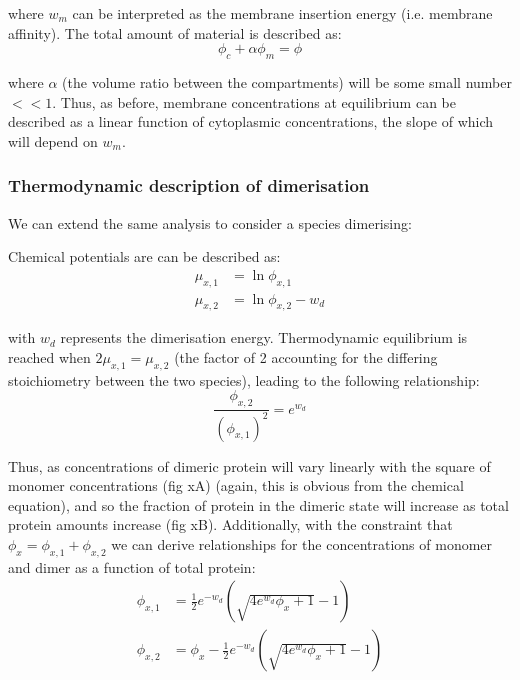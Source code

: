 \documentclass[12pt]{"article"}
\begin{document}
where $w_m$ can be interpreted as the membrane insertion energy (i.e. membrane affinity). The total amount of material is described as:
\begin{equation}
\phi_c + \alpha\phi_m = \phi
\end{equation}

where $\alpha$ (the volume ratio between the compartments) will be some small number $<<1$. Thus, as before, membrane concentrations at equilibrium can be described as a linear function of cytoplasmic concentrations, the slope of which will depend on $w_m$.\\

\subsubsection{Thermodynamic description of dimerisation}

We can extend the same analysis to consider a species dimerising:

\begin{center}
\end{center}

Chemical potentials are can be described as:
\begin{align}
\mu_{x,1} &= \ln\phi_{x,1}\\
\mu_{x,2} &= \ln\phi_{x,2} - w_d
\end{align} 

with $w_d$ represents the dimerisation energy. Thermodynamic equilibrium is reached when $2\mu_{x,1} = \mu_{x,2}$ (the factor of 2 accounting for the differing stoichiometry between the two species), leading to the following relationship:
\begin{equation}
\frac{\phi_{x,2}}{(\phi_{x,1})^2} = e^{w_d}
\end{equation}

Thus, as concentrations of dimeric protein will vary linearly with the square of monomer concentrations (fig xA) (again, this is obvious from the chemical equation), and so the fraction of protein in the dimeric state will increase as total protein amounts increase (fig xB). Additionally, with the constraint that $\phi_x = \phi_{x,1} + \phi_{x,2}$ we can derive relationships for the concentrations of monomer and dimer as a function of total protein:
\begin{align}
\phi_{x,1} &= \frac{1}{2}e^{-w_d}\left(\sqrt{4e^{w_d}\phi_x + 1} - 1\right)\\
\phi_{x,2} &= \phi_x - \frac{1}{2}e^{-w_d}\left(\sqrt{4e^{w_d}\phi_x + 1} - 1\right)
\end{align}
\end{document}
